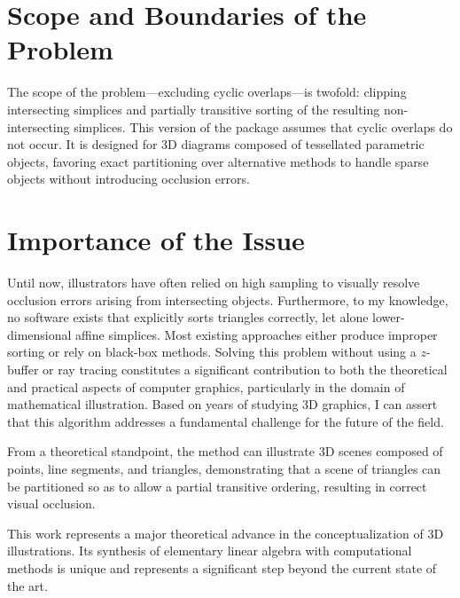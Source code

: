 \section{Scope and Boundaries of the Problem}

The scope of the problem---excluding cyclic overlaps---is twofold:
clipping intersecting simplices and partially transitive sorting
of the resulting non-intersecting simplices. This version of the
package assumes that cyclic overlaps do not occur. It is designed
for \(3\)D diagrams composed of tessellated parametric objects,
favoring exact partitioning over alternative methods to handle
sparse objects without introducing occlusion errors.

\section{Importance of the Issue}

Until now, illustrators have often relied on high sampling to
visually resolve occlusion errors arising from intersecting
objects. Furthermore, to my knowledge, no software exists that
explicitly sorts triangles correctly, let alone lower-dimensional
affine simplices. Most existing approaches either produce
improper sorting or rely on black-box methods. Solving this
problem without using a \(z\)-buffer or ray tracing constitutes
a significant contribution to both the theoretical and practical
aspects of computer graphics, particularly in the domain of
mathematical illustration. Based on years of studying \(3\)D
graphics, I can assert that this algorithm addresses a
fundamental challenge for the future of the field.

From a theoretical standpoint, the method can illustrate
3D scenes composed of points, line segments, and triangles,
demonstrating that a scene of triangles can be partitioned
so as to allow a partial transitive ordering, resulting in
correct visual occlusion.

This work represents a major theoretical advance in the
conceptualization of 3D illustrations. Its synthesis of
elementary linear algebra with computational methods is
unique and represents a significant step beyond the current
state of the art.


